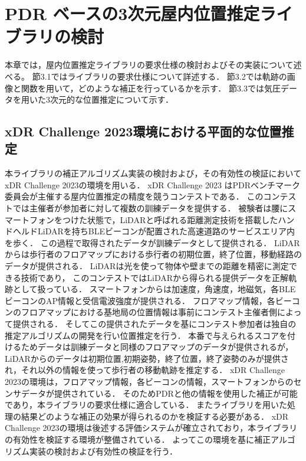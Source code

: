 
\chapter{PDR ベースの3次元屋内位置推定ライブラリの検討}
\thispagestyle{myheadings}
本章では，屋内位置推定ライブラリの要求仕様の検討およびその実装について述べる。
節3.1ではライブラリの要求仕様について詳述する．
節3.2では軌跡の画像と関数を用いて，どのような補正を行っているかを示す．
節3.3では気圧データを用いた3次元的な位置推定について示す．





\section{xDR Challenge 2023環境における平面的な位置推定}

本ライブラリの補正アルゴリズム実装の検討および，その有効性の検証においてxDR Challenge 2023\cite{xdr}の環境を用いる．
xDR Challenge 2023 はPDRベンチマーク委員会が主催する屋内位置推定の精度を競うコンテストである．
このコンテストでは主催者が参加者に対して複数の訓練データを提供する．
被験者は腰にスマートフォンをつけた状態で，LiDARと呼ばれる距離測定技術を搭載したハンドヘルドLiDARを持ちBLEビーコンが配置された高速道路のサービスエリア内を歩く．
この過程で取得されたデータが訓練データとして提供される．
LiDARからは歩行者のフロアマップにおける歩行者の初期位置，終了位置，移動経路のデータが提供される．
LiDARは光を使って物体や壁までの距離を精密に測定できる技術であり，
このコンテストではLiDARから得られる提供データを正解軌跡として扱っている．
スマートフォンからは加速度，角速度，地磁気，各BLEビーコンのAP情報と受信電波強度が提供される．
フロアマップ情報，各ビーコンのフロアマップにおける基地局の位置情報は事前にコンテスト主催者側によって提供される．
そしてこの提供されたデータを基にコンテスト参加者は独自の推定アルゴリズムの開発を行い位置推定を行う．
本番で与えられるスコアを付けるためデータは訓練データと同様のフロアマップのデータが提供されるが，
LiDARからのデータは初期位置,初期姿勢，終了位置，終了姿勢のみが提供され，それ以外の情報を使って歩行者の移動軌跡を推定する．
xDR Challenge 2023の環境は，フロアマップ情報，各ビーコンの情報，スマートフォンからのセンサデータが提供されている．
そのためPDRと他の情報を使用した補正が可能であり，本ライブラリの要求仕様に適合している．
またライブラリを用いた処理の結果どのような補正の効果が得られるのかを検証する必要がある．
xDR Challenge 2023の環境は後述する評価システムが確立されており，本ライブラリの有効性を検証する環境が整備されている．
よってこの環境を基に補正アルゴリズム実装の検討および有効性の検証を行う．

